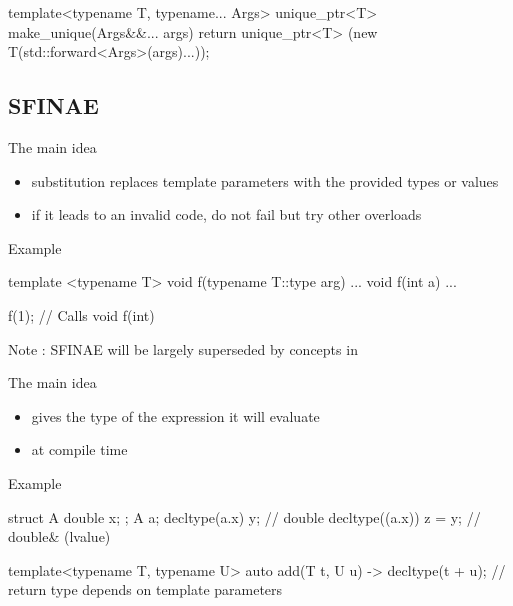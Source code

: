 \begin{frame}[fragile]
  \begin{cppcode*}{}
    template<typename T, typename... Args>
    unique_ptr<T> make_unique(Args&&... args) {
      return unique_ptr<T>
        (new T(std::forward<Args>(args)...));
    }
  \end{cppcode*}
\end{frame}

\subsection[sfinae]{SFINAE}

\begin{frame}[fragile]
  \begin{block}{The main idea}
    \begin{itemize}
    \item substitution replaces template parameters with the provided types or values
    \item if it leads to an invalid code, do not fail but try other overloads
    \end{itemize}
  \end{block}
  \begin{exampleblock}{Example}
    \begin{cppcode*}{}
      template <typename T>
      void f(typename T::type arg) { ... }
      void f(int a) { ... }

      f(1); // Calls void f(int)
    \end{cppcode*}
  \end{exampleblock}
  Note : SFINAE will be largely superseded by concepts in 
\end{frame}

\begin{frame}[fragile]
  \begin{block}{The main idea}
    \begin{itemize}
    \item gives the type of the expression it will evaluate
    \item at compile time
    \end{itemize}
  \end{block}
  \begin{exampleblock}{Example}
    \begin{cppcode*}{}
      struct A { double x; };
      A a;
      decltype(a.x) y;       // double
      decltype((a.x)) z = y; // double& (lvalue)

      template<typename T, typename U>
      auto add(T t, U u) -> decltype(t + u);
      // return type depends on template parameters
    \end{cppcode*}
  \end{exampleblock}
\end{frame}

